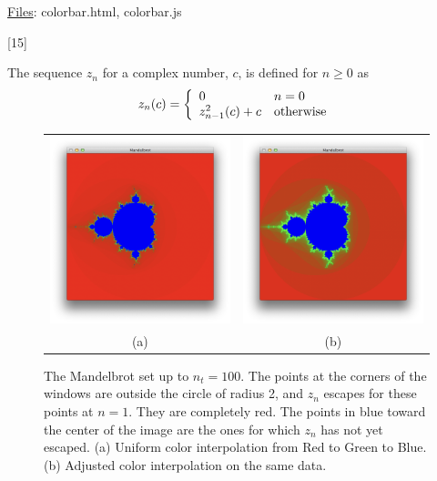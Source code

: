 \documentclass[addpoints]{exam}
\begin{document}
\begin{questions}
  \underline{Files}: colorbar.html, colorbar.js

[15]

  The sequence $z_n$ for a complex number, $c$, is defined for $n\geq 0$ as
  \[
    z_n(c) = \left\{
      \begin{array}{l@{\quad}l}
        0 & n = 0\\
        z^2_{n-1}(c)+c & \textrm{otherwise}
      \end{array}
    \right.
  \]

  \begin{figure}
    \centering
    \begin{tabular}{cc}
      \includegraphics[width=.47\linewidth]{mandelbrot1}& \includegraphics[width=.47\linewidth]{mandelbrot2}\\
      (a) & (b)
    \end{tabular}
    \caption{The Mandelbrot set up to $n_t = 100$. The points at the corners of the windows are outside the circle of radius 2, and $z_n$ escapes for these points at $n=1$. They are completely red. The points in blue toward the center of the image are the ones for which $z_n$ has not yet escaped. (a) Uniform color interpolation from Red to Green to Blue. (b) Adjusted color interpolation on the same data.}
    \label{fig:mandelbrot}
  \end{figure}
  

\end{questions}
\end{document}
